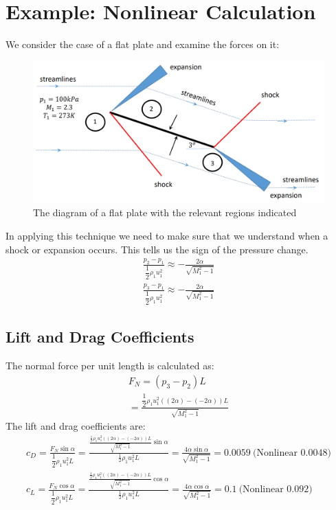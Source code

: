 \section{Example: Nonlinear Calculation}
We consider the case of a flat plate and examine the forces on it:
\begin{figure}[H]
    \centering
    \includegraphics[width = 0.9 \textwidth]{./img/diagram32.png}
    \caption{The diagram of a flat plate with the relevant regions indicated}
\end{figure}
In applying this technique we need to make sure that we understand when a shock or expansion occurs. This tells us the sign of the pressure change.
\begin{gather}
    \frac{p_2-p_1}{\dfrac{1}{2}\rho_1 u_1^2} \approx -\frac{2\alpha}{\sqrt{M_1^2-1}} \\[5pt]
    \frac{p_3-p_1}{\dfrac{1}{2}\rho_1 u_1^2} \approx -\frac{2\alpha}{\sqrt{M_1^2-1}}
\end{gather}
\subsection{Lift and Drag Coefficients}
The normal force per unit length is calculated as:
\begin{gather}
    F_N = (p_3-p_2)L \\[5pt]
    = \frac{\dfrac{1}{2}\rho_1 u_1^2\left((2\alpha)-(-2\alpha)\right)L}{\sqrt{M_1^2-1}}
\end{gather}
The lift and drag coefficients are:
\begin{gather}
    c_D = \frac{F_N\sin\alpha}{\dfrac{1}{2}\rho_1 u_1^2 L} = \frac{\frac{\frac{1}{2}\rho_1 u_1^2\left((2\alpha)-(-2\alpha)\right)L}{\sqrt{M_1^2-1}}\sin\alpha}{\frac{1}{2}\rho_1 u_1^2 L} = \frac{4\alpha\sin\alpha}{\sqrt{M_1^2-1}} = 0.0059 \ \text{(Nonlinear 0.0048)} \\[5pt]
    c_L = \frac{F_N\cos\alpha}{\dfrac{1}{2}\rho_1 u_1^2 L} = \frac{\frac{\frac{1}{2}\rho_1 u_1^2\left((2\alpha)-(-2\alpha)\right)L}{\sqrt{M_1^2-1}}\cos\alpha}{\frac{1}{2}\rho_1 u_1^2 L} = \frac{4\alpha\cos\alpha}{\sqrt{M_1^2-1}} = 0.1 \ \text{(Nonlinear 0.092)}
\end{gather}
